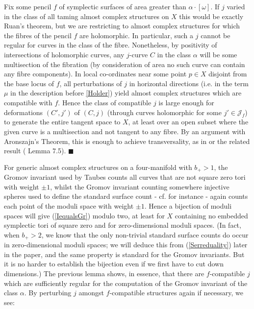 \documentclass[10pt]{article}
\newenvironment{Pf}{\par \noindent{\sc Proof:} }{\quad $\blacksquare$ \par
\vspace{0.5cm}}
\begin{document}
\begin{Pf}  Fix some pencil $f$ of symplectic surfaces of area
  greater than $\alpha \cdot [\omega]$.  If $j$ varied in the class of
  all taming almost complex
  structures on $X$ this would be exactly Ruan's theorem, but we are
  restricting to almost complex structures for which the fibres of the
  pencil $f$ are holomorphic.  In particular, such a $j$ cannot be
  regular for curves in the class of the fibre.  Nonetheless, by
  positivity of intersections of holomorphic curves, any
  $j$-curve $C$ in the class $\alpha$ will be some multisection of the
  fibration (by consideration of area no such curve can contain
  any fibre components).  In local co-ordinates near some point $p \in
  X$ disjoint from the base locus of $f$, all perturbations of $j$ in
  horizontal 
  directions (i.e. in the term $\mu$ in the description before
  \ref{Holder}) yield almost complex structures which are compatible
  with $f$.  Hence the class of compatible $j$ is large enough for
  deformations $(C',j')$ of $(C,j)$ (through curves holomorphic for
  some $j' \in \mathcal{J}_f$) 
  to generate the entire tangent space to $X$, at
  least over an open subset where the given curve is a multisection and
  not tangent to any fibre.  By an argument with Aronszajn's Theorem,
  this is enough to 
  achieve transversality, as in \cite{McD-S:Jhol} or the related
  result (\cite{SKDIS} Lemma 7.5). 
\end{Pf}

\noindent For generic almost complex structures on a four-manifold
with $b_+ > 1$,  
the Gromov invariant used by Taubes counts all curves that are not
square zero tori with weight $\pm 1$, whilst the Gromov invariant counting
somewhere injective spheres  used to define
the standard surface count - cf. \cite{McD-S:Jhol} for instance  -
again counts each point of the moduli
space with weight $\pm 1$.  Hence a bijection of moduli spaces will
give (\ref{IequalsGr}) modulo two, at least for $X$ containing no
embedded symplectic tori of square zero and for 
zero-dimensional moduli spaces.  (In 
fact, when $b_+ > 2$, we know that the only non-trivial standard
surface counts do occur in 
zero-dimensional moduli spaces; we will deduce this from
(\ref{Serreduality}) later in the paper, and the same property is
standard for the Gromov invariants.  But it is no harder to
establish the bijection 
even if we first have to cut down dimensions.)   The previous lemma
shows, in essence, that there are $f$-compatible $j$ which
are sufficiently regular for the computation of the Gromov invariant
of the class $\alpha$.  By
perturbing $j$ amongst $f$-compatible structures again if necessary, we see:
\end{document}
